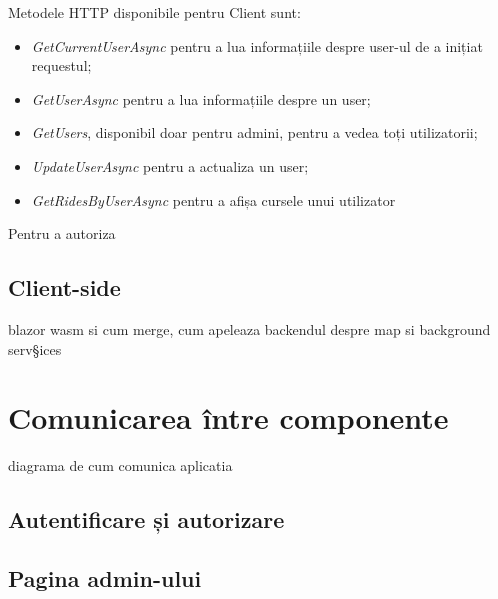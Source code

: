 Metodele HTTP disponibile pentru Client sunt:
\begin{itemize}
    \item \textit{GetCurrentUserAsync} pentru a lua informațiile despre user-ul de a inițiat requestul;
    \item \textit{GetUserAsync} pentru a lua informațiile despre un user;
    \item \textit{GetUsers}, disponibil doar pentru admini, pentru a vedea toți utilizatorii;
    \item \textit{UpdateUserAsync} pentru a actualiza un user;
    \item \textit{GetRidesByUserAsync} pentru a afișa cursele unui utilizator
\end{itemize}

Pentru a autoriza 

\subsection{Client-side}
blazor wasm si cum merge, cum apeleaza backendul
despre map si background serv§ices
\section{Comunicarea între componente}
diagrama de cum comunica aplicatia
\subsection{Autentificare și autorizare}
\subsection{Pagina admin-ului}